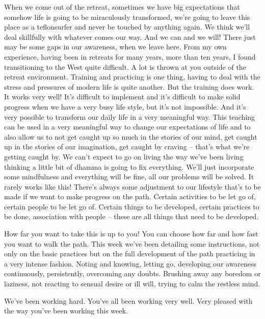 \documentclass[letterpaper,10pt,english]{sphinxmanual}
\begin{document}
\sphinxAtStartPar
When we come out of the retreat, sometimes we have big expectations
that somehow life is going to be miraculously transformed, we’re going to
leave this place as a teflon\sphinxhyphen{}surfer and never be touched by anything again.
We think we’ll deal skillfully with whatever comes our way. And we can and
we will! There just may be some gaps in our awareness, when we leave here.
From  my  own  experience,  having  been  in  retreats  for  many  years,
more than ten years, I found transitioning to the West quite difficult. A lot
is thrown at you outside of the retreat environment. Training and practicing
is one thing, having to deal with the stress and pressures of modern life is
quite another. But the training does work. It works very well! It’s difficult
  to implement and it’s difficult to make solid progress when we have a very
busy life style, but it’s not impossible. And it’s very possible to transform
our daily life in a very meaningful way. This teaching can be used in a very
meaningful way to change our expectations of life and to also allow us to not
get caught up so much in the stories of our mind, get caught up in the stories
of our imagination, get caught by craving – that’s what we’re getting caught
by. We  can’t  expect  to  go  on  living  the  way  we’ve  been  living  thinking  a
little bit of dhamma is going to fix everything. We’ll just incorporate some
mindfulness and everything will be fine, all our problems will be solved. It
rarely works like this! There’s always some adjustment to our lifestyle that’s
to be made if we want to make progress on the path. Certain activities to be
let go of, certain people to be let go of. Certain things to be developed, certain practices to be done, association with people – these are all things that
need to be developed.

\sphinxAtStartPar
How far you want to take this is up to you! You can choose how far
and  how  fast  you  want  to  walk  the  path. This  week  we’ve  been  detailing
some instructions, not only on the basic practices but on the full development of the path practicing in a very intense fashion. Noting and knowing,
letting go, developing our awareness continuously, persistently, overcoming
any doubts. Brushing away any boredom or laziness, not reacting to sensual
desire or ill will, trying to calm the restless mind.

\sphinxAtStartPar
We’ve  been  working  hard. You’ve  all  been  working  very  well. Very
pleased with the way you’ve been working this week.
\end{document}
